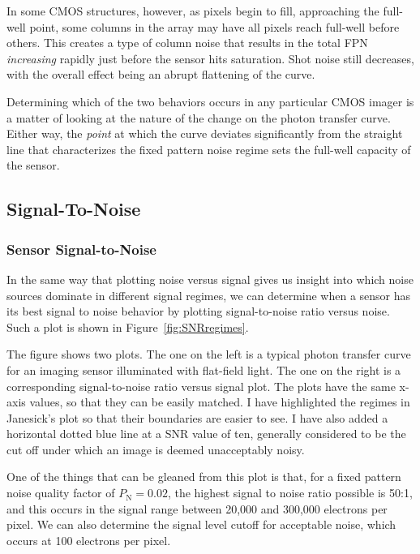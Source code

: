 \documentclass[10pt]{article}
\begin{document}
In some CMOS structures, however, as pixels begin to fill, approaching the full-well point, some columns in the array may have all pixels reach full-well before others. This creates a type of column noise that results in the total FPN \emph{increasing} rapidly just before the sensor hits saturation. Shot noise still decreases, with the overall effect being an abrupt flattening of the curve.  

Determining which of the two behaviors occurs in any particular CMOS imager is a matter of looking at the nature of the change on the photon transfer curve. Either way, the \emph{point} at which the curve deviates significantly from the straight line that characterizes the fixed pattern noise regime sets the full-well capacity of the sensor. 


\subsection{Signal-To-Noise}
\label{sec:SNR}

\subsubsection{Sensor Signal-to-Noise}

In the same way that plotting noise versus signal gives us insight into which noise sources dominate in different signal regimes, we can determine when a sensor has its best signal to noise behavior by plotting signal-to-noise ratio versus noise. Such a plot is shown in Figure~\ref{fig:SNRregimes}. 



The figure shows two plots. The one on the left is a typical photon transfer curve for an imaging sensor illuminated with flat-field light. The one on the right is a corresponding signal-to-noise ratio versus signal plot. The plots have the same x-axis values, so that they can be easily matched. I have highlighted the regimes in Janesick's plot so that their boundaries are easier to see. I have also added a horizontal dotted blue line at a SNR value of ten, generally considered to be the cut off under which an image is deemed unacceptably noisy. 

One of the things that can be gleaned from this plot is that, for a fixed pattern noise quality factor of $ {P}_{\text{N}} = 0.02 $, the highest signal to noise ratio possible is 50:1, and this occurs in the signal range between 20,000 and 300,000 electrons per pixel. We can also determine the signal level cutoff for acceptable noise, which occurs at 100 electrons per pixel.
\end{document}
